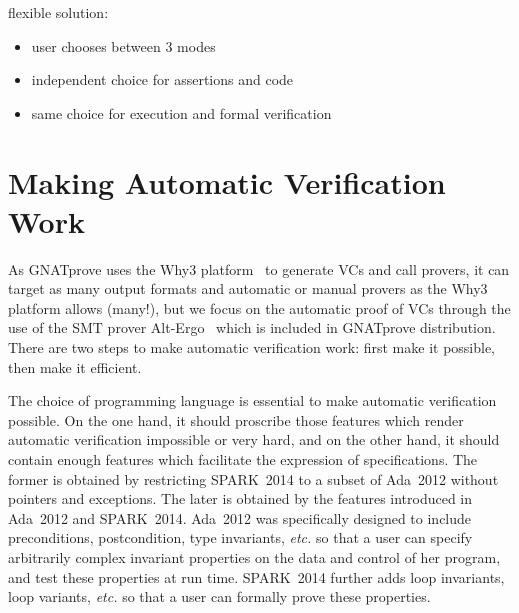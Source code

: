 \documentclass[sttt,draft]{svjour}
\newcommand{\gnatprove}{GNATprove\xspace}
\newcommand{\newspark}{SPARK~2014\xspace}
\newcommand{\adatwtw}{Ada~2012\xspace}
\newcommand{\etc}{\textit{etc.}\xspace}
\begin{document}
flexible solution:
\begin{itemize}
\item user chooses between 3 modes
\item independent choice for assertions and code
\item same choice for execution and formal verification
\end{itemize}

\section{Making Automatic Verification Work}
\label{automation}

As \gnatprove uses the Why3 platform~\cite{why3} to generate VCs and call
provers, it can target as many output formats and automatic or manual provers
as the Why3 platform allows (many!), but we focus on the automatic proof of VCs
through the use of the SMT prover Alt-Ergo~\cite{altergo} which is included in
\gnatprove distribution. There are two steps to make automatic verification
work: first make it possible, then make it efficient.

The choice of programming language is essential to make automatic verification
possible. On the one hand, it should proscribe those features which render
automatic verification impossible or very hard, and on the other hand, it
should contain enough features which facilitate the expression of
specifications. The former is obtained by restricting \newspark to a subset of
\adatwtw without pointers and exceptions. The later is obtained by the features
introduced in \adatwtw and \newspark. \adatwtw was specifically designed to
include preconditions, postcondition, type invariants, \etc so that a user can
specify arbitrarily complex invariant properties on the data and control of her
program, and test these properties at run time. \newspark further adds loop
invariants, loop variants, \etc so that a user can formally prove these
properties.
\end{document}
